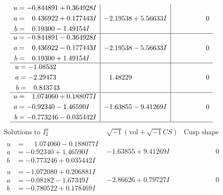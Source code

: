 \documentclass[1p]{elsarticle_modified}
\theoremstyle{definition}
\newcommand{\I}{\sqrt{-1}}
\begin{document}
$$\begin{array}{c|c|c}
\begin{aligned}
u &= -0.844891 + 0.364928 I \\
a &= \phantom{-}0.436922 + 0.177443 I \\
b &= \phantom{-}0.19300 - 1.49154 I\end{aligned}
 & -2.19538 + 5.56633 I & \phantom{-0.000000 } 0 \\ \hline\begin{aligned}
u &= -0.844891 - 0.364928 I \\
a &= \phantom{-}0.436922 - 0.177443 I \\
b &= \phantom{-}0.19300 + 1.49154 I\end{aligned}
 & -2.19538 - 5.56633 I & \phantom{-0.000000 } 0 \\ \hline\begin{aligned}
u &= -1.08532\phantom{ +0.000000I} \\
a &= -2.29473\phantom{ +0.000000I} \\
b &= \phantom{-}0.843743\phantom{ +0.000000I}\end{aligned}
 & \phantom{-}1.48229\phantom{ +0.000000I} & \phantom{-0.000000 } 0 \\ \hline\begin{aligned}
u &= \phantom{-}1.074060 + 0.188077 I \\
a &= -0.92340 - 1.46590 I \\
b &= -0.773246 - 0.035442 I\end{aligned}
 & -1.63855 - 9.41269 I & \phantom{-0.000000 } 0\\
 \hline 
 \end{array}$$\newpage$$\begin{array}{c|c|c}  
\text{Solutions to }I^u_{2}& \I (\text{vol} + \sqrt{-1}CS) & \text{Cusp shape}\\
 \hline 
\begin{aligned}
u &= \phantom{-}1.074060 - 0.188077 I \\
a &= -0.92340 + 1.46590 I \\
b &= -0.773246 + 0.035442 I\end{aligned}
 & -1.63855 + 9.41269 I & \phantom{-0.000000 } 0 \\ \hline\begin{aligned}
u &= -1.072080 + 0.206881 I \\
a &= -0.08182 - 1.67349 I \\
b &= -0.780522 + 0.178469 I\end{aligned}
 & -2.86626 + 0.79727 I & \phantom{-0.000000 } 0 \\ \hline\begin{aligned}

\end{aligned}
\end{array}$$
\end{document}

